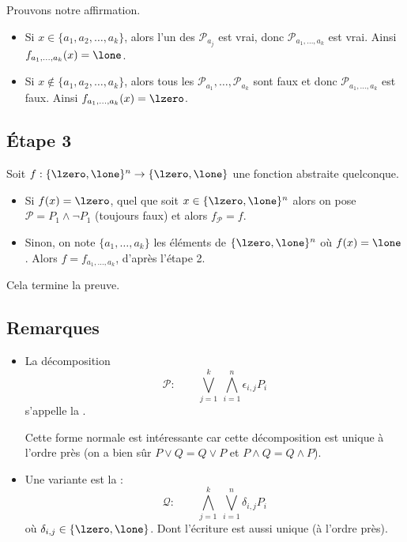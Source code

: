 \documentclass[11pt,class=report,crop=false]{standalone}
\begin{document}
Prouvons notre affirmation.
\begin{itemize}
	\item Si $x \in \{ a_1,a_2,\ldots,a_k \}$, alors l'un des $\mathcal{P}_{a_j}$ est vrai, donc $\mathcal{P}_{a_1,\ldots,a_k}$ est vrai. Ainsi $f_{a_1,\ldots,a_k}(x) = \lone$.
	
	\item Si $x \notin \{ a_1,a_2,\ldots,a_k \}$, alors tous les $\mathcal{P}_{a_1},\ldots,\mathcal{P}_{a_k}$ sont faux et donc $\mathcal{P}_{a_1,\ldots,a_k}$ est faux. Ainsi $f_{a_1,\ldots,a_k}(x) = \lzero$.
\end{itemize}


\subsection{Étape 3}

Soit $f : \{\lzero,\lone\}^n \to \{\lzero,\lone\}$ une fonction abstraite quelconque.
\begin{itemize}
	\item Si $f(x) =\lzero$, quel que soit $x \in  \{\lzero,\lone\}^n$ alors on pose
	$\mathcal{P} = P_1 \land \lnot P_1$ (toujours faux) et alors $f_{\mathcal{P}} = f$.
	
	\item Sinon, on note $\{a_1,\ldots,a_k\}$ les éléments de  $\{\lzero,\lone\}^n$
	où $f(x) = \lone$. Alors $f = f_{a_1,\ldots,a_k}$, d'après l'étape 2.
\end{itemize}

Cela termine la preuve.


\subsection{Remarques}


\begin{itemize}
	\item La décomposition 
	\[
	\mathcal{P} : \qquad \bigvee_{j=1}^k \ \bigwedge_{i=1}^n \epsilon_{i,j} P_i
	\]
	s'appelle la .
	
	Cette forme normale est intéressante car cette décomposition est unique à l'ordre près (on a bien sûr $P \lor Q  = Q \lor P$ et $P\land Q=Q \land P$).
	
	\item Une variante est la  : 
	\[
	\mathcal{Q} : \qquad \bigwedge_{j=1}^k \ \bigvee_{i=1}^n \delta_{i,j} P_i
	\]	
	où $\delta_{i,j} \in \{\lzero,\lone\}$.
	Dont l'écriture est aussi unique (à l'ordre près). 
	
\end{itemize}
\end{document}
